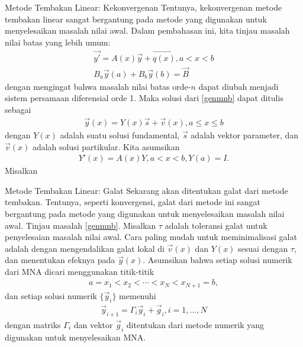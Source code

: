 \documentclass[xcolor={dvipsnames}, 9pt]{beamer}
\begin{document}
    \begin{frame}{Metode Tembakan Linear: Kekonvergenan}
    	Tentunya, kekonvergenan metode tembakan linear sangat bergantung pada metode yang digunakan untuk menyelesaikan masalah nilai awal. Dalam pembahasan ini, kita tinjau masalah nilai batas yang lebih umum:
    	\begin{gather}
    		\vec{y'} = A(x)\vec{y} + \vec{q(x)}, a<x<b \\
    		B_a\vec{y}(a) + B_b\vec{y}(b) = \vec{B} \label{genmnb}
    	\end{gather}
    	dengan mengingat bahwa masalah nilai batas orde-$n$ dapat diubah menjadi sistem persamaan diferensial orde 1. Maka solusi dari \eqref{genmnb} dapat ditulis sebagai
        \begin{align*}
            \vec{y}(x) = Y(x)\vec{s} + \vec{v}(x), a\leq x\leq b
        \end{align*}
        dengan $Y(x)$ adalah suatu solusi fundamental, $\vec{s}$ adalah vektor parameter, dan $\vec{v}(x)$ adalah solusi partikular. Kita asumsikan
        \begin{align*}
            Y'(x) = A(x)Y, a<x<b, Y(a) = I.
        \end{align*}
        Misalkan 
    \end{frame}
    \begin{frame}{Metode Tembakan Linear: Galat}
    	Sekarang akan ditentukan galat dari metode tembakan. Tentunya, seperti konvergensi, galat dari metode ini sangat bergantung pada metode yang digunakan untuk menyelesaikan masalah nilai awal. Tinjau masalah \eqref{genmnb}. \newline
        Misalkan $\tau$ adalah toleransi galat untuk penyelesaian masalah nilai awal. Cara paling mudah untuk meminimalisasi galat adalah dengan mengendalikan galat lokal di $\vec{v}(x)$ dan $Y(x)$ sesuai dengan $\tau$, dan menentukan efeknya pada $\vec{y}(x)$. \newilne
        Asumsikan bahwa setiap solusi numerik dari MNA dicari menggunakan titik-titik
        \begin{align*}
            a = x_1 < x_2 < \cdots < x_N < x_{N+1} = b,
        \end{align*}
        dan setiap solusi numerik $\{\vec{y}_i\}$ memenuhi
        \begin{align*}
            \vec{y}_{i+1} = \Gamma_i\vec{y}_i + \vec{g}_i, i = 1,\dots, N
        \end{align*}
        dengan matriks $\Gamma_i$ dan vektor $\vec{g}_i$ ditentukan dari metode numerik yang digunakan untuk menyelesaikan MNA.
    \end{frame}
\end{document}
